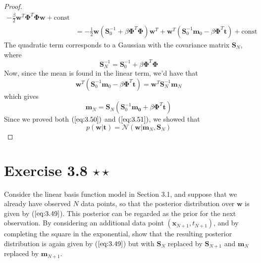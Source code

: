 \begin{proof}
\begin{align*}
            - \frac{\beta}{2} \mathbf{w}^T\mathbf{\Phi}^T\mathbf{\Phi}\mathbf{w} 
            + \text{const} \\
        &= -\frac{1}{2} \mathbf{w}(\mathbf{S}_0^{-1} + \beta \mathbf{\Phi}^T\mathbf{\Phi})\mathbf{w}^T
            + \mathbf{w}^T (\mathbf{S}_0^{-1}\mathbf{m}_0 - \beta\mathbf{\Phi}^T\mathbf{t})
            + \text{const}
    \end{align*}
    The quadratic term corresponds to a Gaussian with the covariance matrix $\mathbf{S}_N$, where
    \begin{equation}\label{eq:3.51}\tag{3.51}
        \mathbf{S}_N^{-1} = \mathbf{S}_0^{-1} + \beta \mathbf{\Phi}^T\mathbf{\Phi}
    \end{equation}
    Now, since the mean is found in the linear term, we'd have that
    \begin{equation*}
        \mathbf{w}^T(\mathbf{S}_0^{-1}\mathbf{m}_0 - \beta\mathbf{\Phi}^T\mathbf{t})
        = \mathbf{w}^T\mathbf{S}_N^{-1}\mathbf{m}_N
    \end{equation*}
    which gives
    \begin{equation}\label{eq:3.50}\tag{3.50}
        \mathbf{m}_N = \mathbf{S}_N(\mathbf{S}_0^{-1}\mathbf{m_0} + \beta\mathbf{\Phi}^T\mathbf{t})
    \end{equation}
    Since we proved both $(\ref{eq:3.50})$ and $(\ref{eq:3.51})$, we showed that
    \begin{equation}\label{eq:3.49}\tag{3.49}
        p(\mathbf{w} | \mathbf{t}) = \mathcal{N}(\mathbf{w} | \mathbf{m}_N, \mathbf{S}_N)
    \end{equation}
\end{proof}

\section*{Exercise 3.8 $\star \star$}
Consider the linear basis function model in Section 3.1, and suppose
that we already have observed $N$ data points, so that the posterior
distribution over $\mathbf{w}$ is given by ($\ref{eq:3.49}$). This posterior
can be regarded as the prior for the next observation. By considering an additional
data point $(\mathbf{x}_{N + 1}, t_{N + 1})$, and by completing the square in the
exponential, show that the resulting posterior distribution is again
given by ($\ref{eq:3.49}$) but with $\mathbf{S}_N$ replaced by $\mathbf{S}_{N + 1}$
and $\mathbf{m}_N$ replaced by $\mathbf{m}_{N + 1}$.

\vspace{1em}

